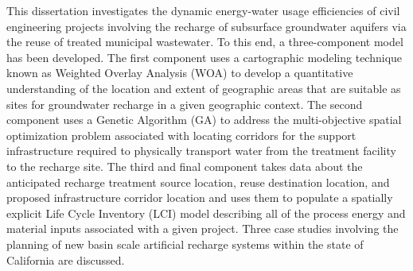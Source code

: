 
This dissertation investigates the dynamic energy-water usage efficiencies of civil engineering projects involving the recharge of subsurface groundwater aquifers via the reuse of treated municipal wastewater. To this end, a three-component model has been developed. The first component uses a cartographic modeling technique known as Weighted Overlay Analysis (WOA) to develop a quantitative understanding of the location and extent of geographic areas that are suitable as sites for groundwater recharge in a given geographic context. The second component uses a Genetic Algorithm (GA) to address the multi-objective spatial optimization problem associated with locating corridors for the support infrastructure required to physically transport water from the treatment facility to the recharge site. The third and final component takes data about the anticipated recharge treatment source location, reuse destination location, and proposed infrastructure corridor location and uses them to populate a spatially explicit Life Cycle Inventory (LCI) model describing all of the process energy and material inputs associated with a given project. Three case studies involving the planning of new basin scale artificial recharge systems within the state of California are discussed.